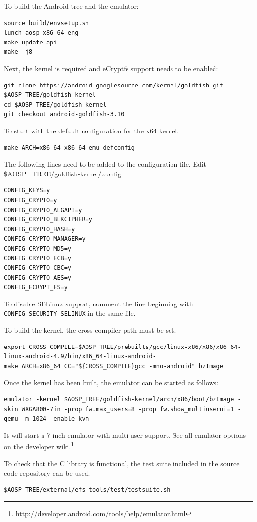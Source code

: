 To build the Android tree and the emulator:
\begin{lstlisting}[numbers=none]
source build/envsetup.sh
lunch aosp_x86_64-eng
make update-api
make -j8
\end{lstlisting}

Next, the kernel is required and eCryptfs support needs to be enabled:
\begin{lstlisting}[numbers=none]
git clone https://android.googlesource.com/kernel/goldfish.git $AOSP_TREE/goldfish-kernel
cd $AOSP_TREE/goldfish-kernel
git checkout android-goldfish-3.10
\end{lstlisting}

To start with the default configuration for the x64 kernel:
\begin{lstlisting}[numbers=none]
make ARCH=x86_64 x86_64_emu_defconfig
\end{lstlisting}

The following lines need to be added to the configuration file. Edit \$AOSP_TREE/goldfish-kernel/.config
\begin{lstlisting}[numbers=none]
CONFIG_KEYS=y
CONFIG_CRYPTO=y
CONFIG_CRYPTO_ALGAPI=y
CONFIG_CRYPTO_BLKCIPHER=y
CONFIG_CRYPTO_HASH=y
CONFIG_CRYPTO_MANAGER=y
CONFIG_CRYPTO_MD5=y
CONFIG_CRYPTO_ECB=y
CONFIG_CRYPTO_CBC=y
CONFIG_CRYPTO_AES=y
CONFIG_ECRYPT_FS=y
\end{lstlisting}
To disable SELinux support, comment the line beginning with \texttt{CONFIG_SECURITY_SELINUX} in the same file.

To build the kernel, the cross-compiler path must be set.
\begin{lstlisting}[numbers=none]
export CROSS_COMPILE=$AOSP_TREE/prebuilts/gcc/linux-x86/x86/x86_64-linux-android-4.9/bin/x86_64-linux-android-
make ARCH=x86_64 CC="${CROSS_COMPILE}gcc -mno-android" bzImage
\end{lstlisting}

Once the kernel has been built, the emulator can be started as follows:
\begin{lstlisting}[numbers=none]
 emulator -kernel $AOSP_TREE/goldfish-kernel/arch/x86/boot/bzImage -skin WXGA800-7in -prop fw.max_users=8 -prop fw.show_multiuserui=1 -qemu -m 1024 -enable-kvm
\end{lstlisting}
It will start a 7 inch emulator with multi-user support. See all emulator options on the developer wiki.\footnote{\url{http://developer.android.com/tools/help/emulator.html}}

To check that the C library is functional, the test suite included in the source code repository can be used.
\begin{lstlisting}[numbers=none]
$AOSP_TREE/external/efs-tools/test/testsuite.sh
\end{lstlisting}

